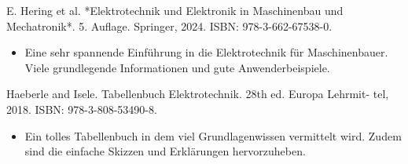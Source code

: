 E. Hering et al. *Elektrotechnik und Elektronik in Maschinenbau und Mechatronik*. 5. Auflage. Springer, 2024. ISBN: 978-3-662-67538-0.\cite{Hering:2024}
\begin{itemize}
	\item Eine sehr spannende Einführung in die Elektrotechnik für Maschinenbauer. Viele grundlegende Informationen und gute Anwenderbeispiele. 
\end{itemize}

Haeberle and Isele. Tabellenbuch Elektrotechnik. 28th ed. Europa Lehrmit-
tel, 2018. ISBN: 978-3-808-53490-8.\cite{Haeberle:2018}
\begin{itemize}
	\item Ein tolles Tabellenbuch in dem viel Grundlagenwissen vermittelt wird. Zudem sind die einfache Skizzen und Erklärungen hervorzuheben.
\end{itemize}